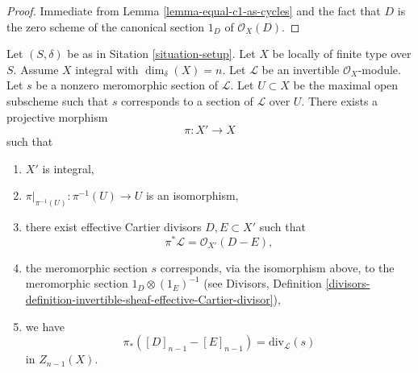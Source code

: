 \begin{proof}
Immediate from Lemma \ref{lemma-equal-c1-as-cycles}
and the fact that $D$ is the zero
scheme of the canonical section $1_D$ of $\mathcal{O}_X(D)$.
\end{proof}

\begin{lemma}
\label{lemma-blowing-up-denominators}
Let $(S, \delta)$ be as in Sitation \ref{situation-setup}.
Let $X$ be locally of finite type over $S$.
Assume $X$ integral with $\dim_\delta(X) = n$.
Let $\mathcal{L}$ be an invertible $\mathcal{O}_X$-module.
Let $s$ be a nonzero meromorphic section of $\mathcal{L}$.
Let $U \subset X$ be the maximal open subscheme such that
$s$ corresponds to a section of $\mathcal{L}$ over $U$.
There exists a projective morphism
$$
\pi : X' \longrightarrow X
$$
such that
\begin{enumerate}
\item $X'$ is integral,
\item $\pi|_{\pi^{-1}(U)} : \pi^{-1}(U) \to U$ is an isomorphism,
\item there exist effective Cartier divisors $D, E \subset X'$
such that 
$$
\pi^*\mathcal{L} = \mathcal{O}_{X'}(D - E),
$$
\item the meromorphic section $s$ corresponds, via the isomorphism above,
to the meromorphic section $1_D \otimes (1_E)^{-1}$ (see Divisors,
Definition
\ref{divisors-definition-invertible-sheaf-effective-Cartier-divisor}),
\item we have
$$
\pi_*([D]_{n - 1} - [E]_{n - 1}) = \text{div}_{\mathcal{L}}(s)
$$
in $Z_{n - 1}(X)$.
\end{enumerate}
\end{lemma}

